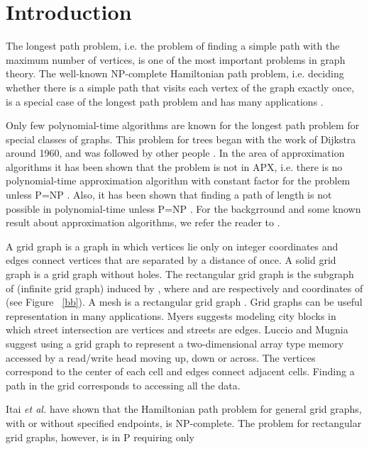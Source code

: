 \documentclass[preprint,12pt]{elsarticle}
\begin{document}
\section{Introduction}\label{IntroSect}
The longest path problem, i.e. the problem of finding a simple path
with the maximum number of vertices, is one of the most important
problems in graph theory. The well-known NP-complete Hamiltonian
path problem, i.e. deciding whether there is a simple path that
visits each vertex of the graph exactly once, is a special case of
the longest path problem and has many applications \cite{D:GT,
GJ:CAI}. \par Only few polynomial-time algorithms are known for the
longest path problem for special classes of graphs. This problem for
trees began with the work of Dijkstra around 1960, and was followed
by other people \cite{BSZVGF:OCALPIAT, G:FALPIACMD, LMN:TLPPIPOIG,
MC:ASPAFTLPPOCG, UU:OCLPISGC}.
In the area of approximation
algorithms it has been shown that the problem is not in APX, i.e.
there is no polynomial-time approximation algorithm with constant
factor for the problem unless P=NP \cite{G:FALPIACMD}. Also, it has
been shown that finding a path of length  is not
possible in polynomial-time unless P=NP \cite{KMR:OATLPIAG}. For the
backgrround and some known result about approximation algorithms, we
refer the reader to \cite{BH:FAPOSL, GN:FLPCAC, ZL:AFLPIG}.\par A
grid graph is a graph in which vertices lie only on integer
coordinates and edges connect vertices that are separated by a
distance of once. A solid grid graph is a grid graph without holes.
The rectangular grid graph  is the subgraph of 
(infinite grid graph) induced by , where  and  are
respectively  and  coordinates of  (see Figure ~\ref{bb}).
A mesh  is a rectangular grid graph . Grid graphs
can be useful representation in many applications. Myers \cite{M}
suggests modeling city blocks in which street intersection are
vertices and streets are edges. Luccio and Mugnia \cite{LM:HPOARC}
suggest using a grid graph to represent a two-dimensional array type
memory accessed by a read/write head moving up, down or across. The
vertices correspond to the center of each cell and edges connect
adjacent cells. Finding a path in the grid corresponds to accessing
all the data.\par Itai \textit{et al.} \cite{IPS:HPIGG} have shown
that the Hamiltonian path problem for general grid graphs, with or
without specified endpoints, is NP-complete. The problem for
rectangular grid graphs, however, is in P requiring only
\end{document}
